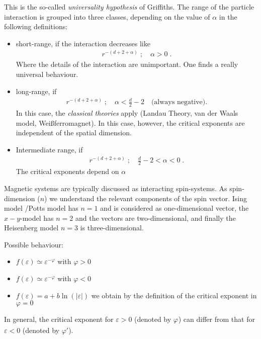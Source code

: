 This is the so-called {\em universality hypothesis} of Griffiths.
The range of the particle interaction is grouped into three classes, depending on the value of $\alpha$ in the following definitions:
\begin{itemize}
	\item short-range, if the interaction decreases like
%
\begin{align*}
r^{-(d+2+\alpha)}\;;\quad \alpha > 0\;.
\end{align*}
%
Where the details of the interaction are unimportant.
One finds a really universal behaviour.
\item  long-range, if  
%
\begin{align*}
r^{-(d+2+\alpha)}\;;\quad \alpha< \frac{d}{2}-2\quad\text{(always negative)}.
\end{align*}
%  
In this case, the {\em classical theories} apply (Landau Theory, van der Waals model, Weißferromagnet). In this case, however, the critical exponents are independent of the spatial dimension. 
 \item Intermediate range, if 
\begin{align*}
r^{-(d+2+\alpha)}\;;\quad \frac{d}{2}-2 < \alpha < 0\;.
\end{align*}
%
The critical exponents depend on $\alpha$
\end{itemize}


Magnetic systems are typically discussed as interacting spin-systems. As spin-dimension ($n$) we understand the relevant components of the spin vector. Ising model /Potts model has $n=1$ and is considered as one-dimensional vector, the $x-y$-model has $n=2$ and the vectors are two-dimensional, and finally the Heisenberg model $n=3$ is three-dimensional. 

Possible behaviour:

\begin{itemize}
	\item{} $f(\varepsilon)\simeq \varepsilon^{-\varphi}$ with $\varphi >0$
	\item{} $f(\varepsilon)\simeq \varepsilon^{-\varphi}$ with $\varphi <0$ 
	\item{} $f(\varepsilon) = a + b\ln(|\varepsilon|)$ we obtain by
	the definition of the critical exponent in  $\varphi =0$ 
\end{itemize}
In general, the critical exponent for $\varepsilon>0$ (denoted by $\varphi_{}$) can differ from that for $\varepsilon<0$ (denoted by $\varphi'$).

